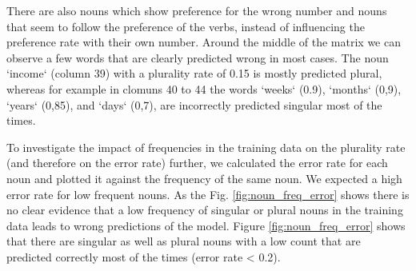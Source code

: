 There are also nouns which show preference for the wrong number and nouns
that seem to follow the preference of the verbs, 
instead of influencing the preference rate with their own number.
Around the middle of the matrix we can observe a few words that are clearly predicted wrong in most cases. The noun `income` (column 39) with a plurality rate of 0.15 is mostly predicted plural, whereas for example in clomuns 40 to 44 the words `weeks` (0.9), `months` (0,9), `years` (0,85), and `days` (0,7), are incorrectly predicted singular most of the times.

To investigate the impact of frequencies in the training data on the plurality rate (and therefore on the error rate) further, we calculated the error rate for each noun and plotted it against the frequency of the same noun. We expected a high error rate for low frequent nouns. As the Fig. \ref{fig:noun_freq_error} shows there is no clear evidence that a low frequency of singular or plural nouns in the training data leads to wrong predictions of the model. Figure \ref{fig:noun_freq_error} shows that there are singular as well as plural nouns with a low count that are predicted correctly most of the times (error rate < 0.2).

